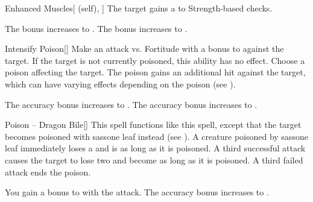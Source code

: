 \lowercase{\hypertarget{spell:Enhanced Muscles}{}}\label{spell:Enhanced Muscles}
\begin{attuneability}[Rank 3]{\hypertarget{spell:Enhanced Muscles}{Enhanced Muscles}}[ (self), ]
The target gains a   to Strength-based checks.

\rankline
{} The bonus increases to .
 The bonus increases to .
\end{attuneability}
\vspace{0.25em}



\lowercase{\hypertarget{spell:Intensify Poison}{}}\label{spell:Intensify Poison}
\begin{freeability}[Rank 3]{\hypertarget{spell:Intensify Poison}{Intensify Poison}}[]
Make an attack vs. Fortitude with a  bonus to  against the target.
If the target is not currently poisoned, this ability has no effect.
\hit Choose a poison affecting the target.
The poison gains an additional hit against the target, which can have varying effects depending on the poison (see ).

\rankline
{} The accuracy bonus increases to .
 The accuracy bonus increases to .
\end{freeability}
\vspace{0.25em}



\lowercase{\hypertarget{spell:Poison -- Dragon Bile}{}}\label{spell:Poison -- Dragon Bile}
\begin{freeability}[Rank 3]{\hypertarget{spell:Poison -- Dragon Bile}{Poison -- Dragon Bile}}[]
This spell functions like this  spell, except that the target becomes poisoned with sassone leaf instead (see ).
A creature poisoned by sassone leaf immediately loses a  and is  as long as it is poisoned.
A third successful attack causes the target to lose two  and become  as long as it is poisoned.
A third failed attack ends the poison.

\rankline
{} You gain a  bonus to  with the attack.
 The accuracy bonus increases to .
\end{freeability}
\vspace{0.25em}




